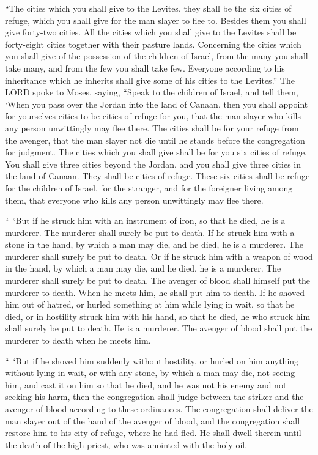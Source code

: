\myverse{}“The cities which you shall give to the Levites, they shall be
the six cities of refuge, which you shall give for the man slayer to flee to. Besides them you shall give
forty-two cities.
\myverse{}All the cities which you shall give to the Levites shall be forty-eight cities
together with their pasture lands.
\myverse{}Concerning the cities which you shall give of the possession of the children
of Israel, from the many you shall take many, and from the few you shall take few. Everyone according
to his inheritance which he inherits shall give some of his cities to the Levites.”
\myverse{}The LORD spoke to Moses, saying,
\myverse{}“Speak to the children of Israel, and tell them, ‘When you pass over the
Jordan into the land of Canaan,
\myverse{}then you shall appoint for yourselves cities to be cities of refuge for you,
that the man slayer who kills any person unwittingly may flee there.
\myverse{}The cities shall be for your refuge from the avenger, that the man slayer
not die until he stands before the congregation for judgment.
\myverse{}The cities which you shall give shall be for you six cities of refuge.
\myverse{}You shall give three cities beyond the Jordan, and you shall give three cities
in the land of Canaan. They shall be cities of refuge.
\myverse{}These six cities shall be refuge for the children of Israel, for the stranger,
and for the foreigner living among them, that everyone who kills any person unwittingly may flee there.


\myverse{}“ ‘But if he struck him with an instrument of iron, so that he
died, he is a murderer. The murderer shall surely be put to death.
\myverse{}If he struck him with a stone in the hand, by which a man may die, and he
died, he is a murderer. The murderer shall surely be put to death.
\myverse{}Or if he struck him with a weapon of wood in the hand, by which a man may
die, and he died, he is a murderer. The murderer shall surely be put to death.
\myverse{}The avenger of blood shall himself put the murderer to death. When he meets
him, he shall put him to death.
\myverse{}If he shoved him out of hatred, or hurled something at him while lying in
wait, so that he died,
\myverse{}or in hostility struck him with his hand, so that he died, he who struck
him shall surely be put to death. He is a murderer. The avenger of blood shall put the murderer to death
when he meets him.


\myverse{}“ ‘But if he shoved him suddenly without hostility, or hurled
on him anything without lying in wait,
\myverse{}or with any stone, by which a man may die, not seeing him, and cast it on
him so that he died, and he was not his enemy and not seeking his harm,
\myverse{}then the congregation shall judge between the striker and the avenger of
blood according to these ordinances.
\myverse{}The congregation shall deliver the man slayer out of the hand of the avenger
of blood, and the congregation shall restore him to his city of refuge, where he had fled. He shall dwell
therein until the death of the high priest, who was anointed with the holy oil.


